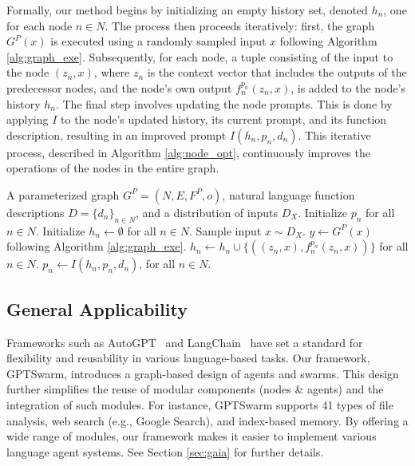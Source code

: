 \documentclass{article}
\theoremstyle{plain}
\theoremstyle{definition}
\theoremstyle{remark}
\begin{document}
Formally, our method begins by initializing an empty history set, denoted $h_n$, one for each node $n \in N$.
The process then proceeds iteratively: first, the graph $G^P(x)$ is executed using a randomly sampled input $x$ following Algorithm \ref{alg:graph_exe}.
Subsequently, for each node, a tuple consisting of the input to the node $(z_n, x)$, where $z_n$ is the context vector that includes the outputs of the predecessor nodes, and the node's own output $f_n^{p_n}(z_n, x)$, is added to the node's history $h_n$.
The final step involves updating the node prompts.
This is done by applying $I$  to the node's updated history, its current prompt, and its function description, resulting in an improved prompt $I(h_n, p_n, d_n)$.
This iterative process, described in Algorithm \ref{alg:node_opt}, continuously improves the operations of the nodes in the entire graph.

\begin{algorithm}[h]
\begin{algorithmic}
\REQUIRE A parameterized graph $G^P = (N, E, F^P, o)$, natural language function descriptions $D = \{d_n\}_{n \in N}$, and a distribution of inputs $D_X$.
\STATE Initialize $p_n$ for all $n \in N$.
\STATE Initialize $h_n \leftarrow \emptyset$ for all $n \in N$.
\STATE Sample input $x \sim D_X$.
\STATE $y \leftarrow G^P(x)$ following Algorithm \ref{alg:graph_exe}.
\STATE $h_n \leftarrow h_n \cup \{((z_n, x), f_n^{p_n}(z_n, x))\}$ for all $n \in N$.
\STATE $p_n \leftarrow I(h_n, p_n, d_n)$, for all ${n\in N}$.
\ENDWHILE
\end{algorithmic}
\caption{Node Optimization}\label{alg:node_opt}
\end{algorithm}
\vspace{-5pt}

\subsection{General Applicability}


Frameworks such as AutoGPT~\citep{autogpt_github} and LangChain~\citep{Chase_LangChain_2022} have set a standard for flexibility and reusability in various language-based tasks.
Our framework, GPTSwarm, introduces a graph-based design of agents and swarms.
This design further simplifies the reuse of modular components (nodes \& agents) and the integration of such modules.
For instance, GPTSwarm supports 41 types of file analysis, web search (e.g., Google Search), and index-based memory.
By offering a wide range of modules, our framework makes it easier to implement various language agent systems.
See Section \ref{sec:gaia} for further details.
\end{document}
